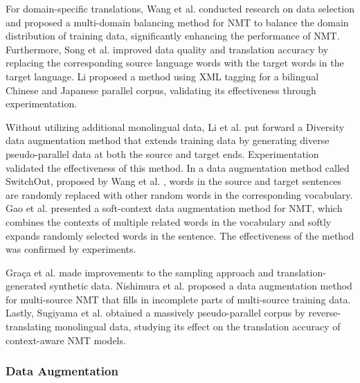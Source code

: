 \documentclass[acmsmall]{acmart}
\begin{document}
For domain-specific translations, Wang et al. \cite{n4-9} conducted research on data selection and proposed a multi-domain balancing method for NMT to balance the domain distribution of training data, significantly enhancing the performance of NMT. Furthermore, Song et al. \cite{n4-10} improved data quality and translation accuracy by replacing the corresponding source language words with the target words in the target language. Li \cite{n4-11} proposed a method using XML tagging for a bilingual Chinese and Japanese parallel corpus, validating its effectiveness through experimentation. 

Without utilizing additional monolingual data, Li et al. \cite{n4-tow2} put forward a Diversity data augmentation method that extends training data by generating diverse pseudo-parallel data at both the source and target ends. Experimentation validated the effectiveness of this method. In a data augmentation method called SwitchOut, proposed by Wang et al. \cite{n4-five5}, words in the source and target sentences are randomly replaced with other random words in the corresponding vocabulary. Gao et al. \cite{n4-six6} presented a soft-context data augmentation method for NMT, which combines the contexts of multiple related words in the vocabulary and softly expands randomly selected words in the sentence. The effectiveness of the method was confirmed by experiments. 

Graça et al. \cite{n4-nineteen19} made improvements to the sampling approach and translation-generated synthetic data. Nishimura et al. \cite{n4-twenty20} proposed a data augmentation method for multi-source NMT that fills in incomplete parts of multi-source training data. Lastly, Sugiyama et al. \cite{n4-twentyone21} obtained a massively pseudo-parallel corpus by reverse-translating monolingual data, studying its effect on the translation accuracy of context-aware NMT models.

\subsubsection{Data Augmentation}
\end{document}
